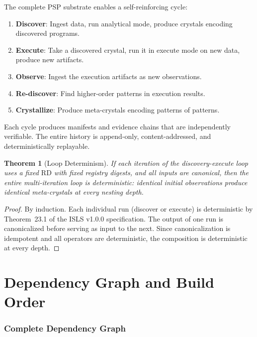 \documentclass[11pt,a4paper,twoside]{article}
\theoremstyle{definition}
\theoremstyle{plain}
\newtheorem{theorem}{Theorem}[section]
\theoremstyle{remark}
\newcommand{\ISLS}{\textsf{ISLS}}
\begin{document}
The complete PSP substrate enables a self-reinforcing cycle:

\begin{enumerate}[nosep]
  \item \textbf{Discover}: Ingest data, run analytical mode, produce
        crystals encoding discovered programs.
  \item \textbf{Execute}: Take a discovered crystal, run it in execute
        mode on new data, produce new artifacts.
  \item \textbf{Observe}: Ingest the execution artifacts as new
        observations.
  \item \textbf{Re-discover}: Find higher-order patterns in execution
        results.
  \item \textbf{Crystallize}: Produce meta-crystals encoding patterns
        of patterns.
\end{enumerate}

Each cycle produces manifests and evidence chains that are independently
verifiable. The entire history is append-only, content-addressed, and
deterministically replayable.

\begin{theorem}[Loop Determinism]\label{thm:loopdeterminism}
If each iteration of the discovery-execute loop uses a fixed
$\mathrm{RD}$ with fixed registry digests, and all inputs are canonical,
then the entire multi-iteration loop is deterministic: identical initial
observations produce identical meta-crystals at every nesting depth.
\end{theorem}

\begin{proof}
By induction. Each individual run (discover or execute) is deterministic
by Theorem~23.1 of the \ISLS{} v1.0.0 specification. The output of one
run is canonicalized before serving as input to the next. Since
canonicalization is idempotent and all operators are deterministic, the
composition is deterministic at every depth.
\end{proof}


\part{Dependency Graph and Build Order}\label{part:deps}

\section{Complete Dependency Graph}\label{sec:depgraph}
\end{document}
